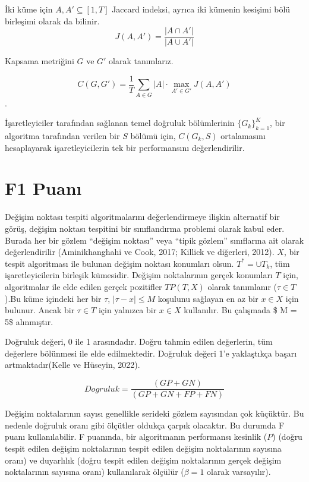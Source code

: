 \documentclass[12pt,twoside]{deuthesis}
\begin{document}
İki küme için \(A, A' \subseteq [1, T ]\) Jaccard indeksi, ayrıca iki kümenin kesişimi bölü birleşimi olarak da bilinir. \[J(A,A')=\frac{|A\cap A'|}{|A\cup A'|}\]

Kapsama metriğini \(G\) ve \(G'\) olarak tanımlarız.

\[C(G,G') = \frac{1}{T} \sum_{A \in G} |A| \cdot \max_{A' \in G'} J(A,A')\].

İşaretleyiciler tarafından sağlanan temel doğruluk bölümlerinin \(\{G_k\}_{k=1}^K\), bir algoritma tarafından verilen bir \(S\) bölümü için, \(C(G_k,S)\) ortalamasını hesaplayarak işaretleyicilerin tek bir performansını değerlendirilir.

\section{F1 Puanı}\label{f1-puanux131}

Değişim noktası tespiti algoritmalarını değerlendirmeye ilişkin alternatif bir görüş, değişim noktası tespitini bir sınıflandırma problemi olarak kabul eder. Burada her bir gözlem ``değişim noktası'' veya ``tipik gözlem'' sınıflarına ait olarak değerlendirilir (Aminikhanghahi ve Cook, 2017; Killick ve diğerleri, 2012). \(X\), bir tespit algoritması ile bulunan değişim noktası konumları olsun. \(T^* = \cup T_k\), tüm işaretleyicilerin birleşik kümesidir. Değişim noktalarının gerçek konumları \(T\) için, algoritmalar ile elde edilen gerçek pozitifler \(TP(T, X)\) olarak tanımlanır (\(\tau \in T\)).Bu küme içindeki her bir \(\tau\), \(|\tau - x| \leq M\) koşulunu sağlayan en az bir \(x \in X\) için bulunur. Ancak bir \(\tau \in T\) için yalnızca bir \(x \in X\) kullanılır. Bu çalışmada \$ M = 5\$ alınmıştır.

Doğruluk değeri, 0 ile 1 arasındadır. Doğru tahmin edilen değerlerin, tüm değerlere bölünmesi ile elde edilmektedir. Doğruluk değeri 1'e yaklaştıkça başarı artmaktadır(Kelle ve Hüseyin, 2022).

\[Dogruluk = \frac{(GP + GN)}{(GP + GN + FP + FN)}\]

Değişim noktalarının sayısı genellikle serideki gözlem sayısından çok küçüktür. Bu nedenle doğruluk oranı gibi ölçütler oldukça çarpık olacaktır. Bu durumda F puanı kullanılabilir. F puanında, bir algoritmanın performansı kesinlik (\(P\)) (doğru tespit edilen değişim noktalarının tespit edilen değişim noktalarının sayısına oranı) ve duyarlılık (doğru tespit edilen değişim noktalarının gerçek değişim noktalarının sayısına oranı) kullanılarak ölçülür (\(\beta = 1\) olarak varsayılır).
\end{document}

